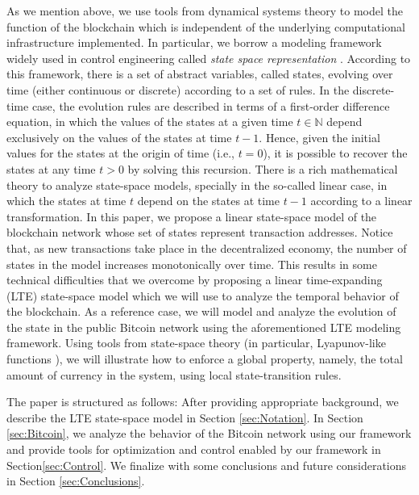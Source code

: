 \documentclass[letterpaper, 10 pt, conference]{ieeeconf}  %
\begin{document}
As we mention above, we use tools from dynamical systems theory to model the function of the blockchain which is independent of the underlying computational infrastructure implemented. In particular, we borrow a modeling framework widely used in control engineering called \emph{state space representation} \cite{sontag2013mathematical}. According to this framework, there is a set of abstract variables, called states, evolving over time (either continuous or discrete) according to a set of rules. In the discrete-time case, the evolution rules are described in terms of a first-order difference equation, in which the values of the states at a given time $t\in \mathbb{N}$ depend exclusively on the values of the states at time $t-1$. Hence, given the initial values for the states at the origin of time (i.e., $t=0$), it is possible to recover the states at any time $t>0$ by solving this recursion. There is a rich mathematical theory to analyze state-space models, specially in the so-called linear case, in which the states at time $t$ depend on the states at time $t-1$ according to a linear transformation. In this paper, we propose a linear state-space model of the blockchain network whose set of states represent transaction addresses. Notice that, as new transactions take place in the decentralized economy, the number of states in the model increases monotonically over time. This results in some technical difficulties that we overcome by proposing a linear time-expanding (LTE) state-space model which we will use to analyze the temporal behavior of the blockchain. As a reference case, we will model and analyze the evolution of the state in the public Bitcoin network using the aforementioned LTE modeling framework. Using tools from state-space theory (in particular, Lyapunov-like functions \cite{khalil1996noninear}), we will illustrate how to enforce a global property, namely, the total amount of currency in the system, using local state-transition rules.

The paper is structured as follows: After providing appropriate background, we describe the LTE state-space model in Section \ref{sec:Notation}. In Section \ref{sec:Bitcoin}, we analyze the behavior of the Bitcoin network using our framework and provide tools for optimization and control enabled by our framework in Section\ref{sec:Control}. We finalize with some conclusions and future considerations in Section \ref{sec:Conclusions}.




\end{document}
